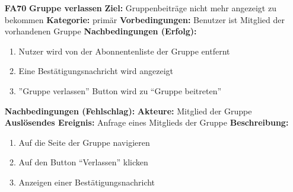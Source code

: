 \documentclass[parskip=full]{scrartcl}
\begin{document}
\begin{itemize}[nosep]
			\item[\textbf{FA70}]\textbf{Gruppe verlassen}
				\newline \textbf{Ziel:} Gruppenbeiträge nicht mehr angezeigt zu bekommen
				\newline \textbf{Kategorie:} primär
				\newline \textbf{Vorbedingungen:} Benutzer ist Mitglied der vorhandenen Gruppe
				\newline \textbf{Nachbedingungen (Erfolg):} 
				\begin{enumerate}[nosep]
					\item Nutzer wird von der Abonnentenliste der Gruppe entfernt
					\item Eine Bestätigungsnachricht wird angezeigt
					\item ”Gruppe verlassen” Button wird zu “Gruppe beitreten” 
				\end{enumerate}
				\textbf{Nachbedingungen (Fehlschlag):}
				\newline \textbf{Akteure:} Mitglied der Gruppe
				\newline \textbf{Auslösendes Ereignis:} Anfrage eines Mitglieds der Gruppe
				\newline \textbf{Beschreibung:}
				\begin{enumerate}[nosep]
					\item Auf die Seite der Gruppe navigieren
					\item Auf den Button “Verlassen” klicken
					\item Anzeigen einer Bestätigungsnachricht\\
				\end{enumerate}
							
		
						
		\end{itemize}
		
\end{document}
